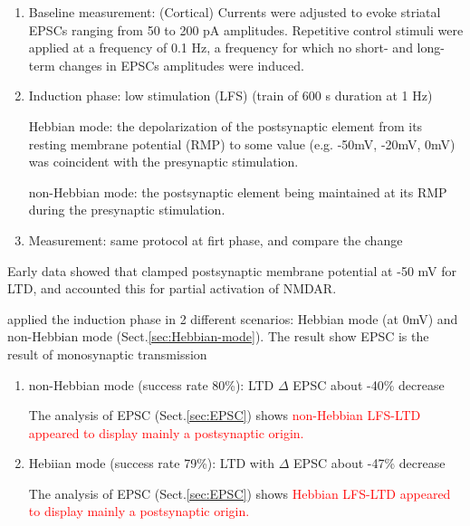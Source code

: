 
\begin{enumerate} 
  \item Baseline measurement: (Cortical) Currents were adjusted to
evoke striatal EPSCs ranging from 50 to 200 pA amplitudes. Repetitive
control stimuli were applied at a frequency of 0.1 Hz, a frequency for
which no short- and long-term changes in EPSCs amplitudes were induced.
  
  \item Induction phase: low stimulation (LFS) (train of 600 s duration at 1
Hz)

Hebbian mode: the depolarization of the postsynaptic element from its resting
membrane potential (RMP) to some value (e.g. -50mV, -20mV, 0mV) was coincident with the presynaptic
stimulation.

non-Hebbian mode: the postsynaptic element being maintained at its RMP during
the presynaptic stimulation.

  \item Measurement: same protocol at firt phase, and compare the change
\end{enumerate}

Early data showed that clamped postsynaptic membrane potential at -50 mV for
LTD, and accounted this for partial activation of NMDAR.

\citep{fino2005} applied the induction phase in 2 different scenarios:
Hebbian mode  (at 0mV) and non-Hebbian mode (Sect.\ref{sec:Hebbian-mode}). The
result show EPSC is the result of monosynaptic transmission
\begin{enumerate}
  \item non-Hebbian mode (success rate 80\%): LTD $\Delta$ EPSC about -40\%
  decrease
  
  The analysis of EPSC (Sect.\ref{sec:EPSC}) shows 
  \textcolor{red}{non-Hebbian LFS-LTD appeared
  to display mainly a postsynaptic origin.}
  
  \item Hebiian mode (success rate 79\%): LTD with $\Delta $ EPSC about -47\%
  decrease
  
  The analysis of EPSC (Sect.\ref{sec:EPSC}) shows 
  \textcolor{red}{Hebbian LFS-LTD appeared
  to display mainly a postsynaptic origin.}
  
\end{enumerate}

